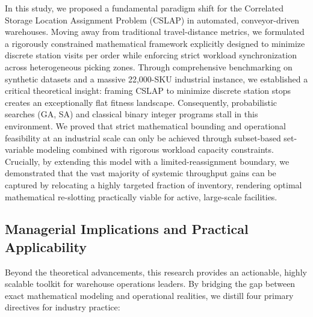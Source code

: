 \documentclass[preprint,review,11pt,authoryear]{elsarticle}
\begin{document}
In this study, we proposed a fundamental paradigm shift for the Correlated Storage Location Assignment Problem (CSLAP) in automated, conveyor-driven warehouses. Moving away from traditional travel-distance metrics, we formulated a rigorously constrained mathematical framework explicitly designed to minimize discrete station visits per order while enforcing strict workload synchronization across heterogeneous picking zones. Through comprehensive benchmarking on synthetic datasets and a massive 22,000-SKU industrial instance, we established a critical theoretical insight: framing CSLAP to minimize discrete station stops creates an exceptionally flat fitness landscape. Consequently, probabilistic searches (GA, SA) and classical binary integer programs stall in this environment. We proved that strict mathematical bounding and operational feasibility at an industrial scale can only be achieved through subset-based set-variable modeling combined with rigorous workload capacity constraints. Crucially, by extending this model with a limited-reassignment boundary, we demonstrated that the vast majority of systemic throughput gains can be captured by relocating a highly targeted fraction of inventory, rendering optimal mathematical re-slotting practically viable for active, large-scale facilities.

\subsection*{Managerial Implications and Practical Applicability}

Beyond the theoretical advancements, this research provides an actionable, highly scalable toolkit for warehouse operations leaders. By bridging the gap between exact mathematical modeling and operational realities, we distill four primary directives for industry practice:
\end{document}
